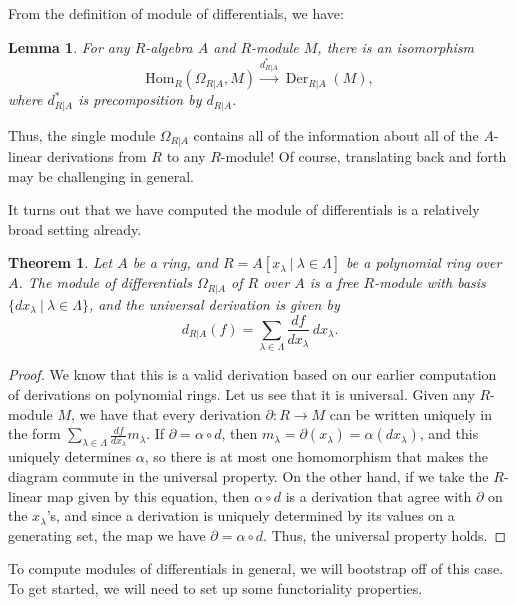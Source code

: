 \documentclass{amsart}[12pt]
\def\Der{\operatorname{Der}}
\newcommand{\Hom}{\mathrm{Hom}}
\numberwithin{equation}{section}
\theoremstyle{plain} %
\newtheorem{thm}[equation]{Theorem}
\newtheorem{lem}[equation]{Lemma}
\theoremstyle{definition}
\theoremstyle{remark}
\newcommand{\xra}[1]{\xrightarrow{#1}}
\begin{document}
From the definition of module of differentials, we have:
\begin{lem} For any $R$-algebra $A$ and $R$-module $M$, there is an isomorphism
\[  \Hom_R(\Omega_{R|A},M) \xra{d^*_{R|A}} \Der_{R|A}(M), \]
where $d^*_{R|A}$ is precomposition by $d_{R|A}$.
\end{lem}

Thus, the single module $\Omega_{R|A}$ contains all of the information about all of the $A$-linear derivations from $R$ to any $R$-module! Of course, translating back and forth may be challenging in general.

It turns out that we have computed the module of differentials is a relatively broad setting already.

\begin{thm}
Let $A$ be a ring, and $R=A[x_\lambda \ | \ \lambda\in \Lambda]$ be a polynomial ring over $A$. The module of differentials $\Omega_{R|A}$ of $R$ over $A$ is a free $R$-module with basis $\{dx_\lambda \ | \ \lambda\in \Lambda\}$, and the universal derivation is given by
\[ d_{R|A}(f) = \sum_{\lambda\in\Lambda} \frac{df}{dx_{\lambda}} \, dx_{\lambda}.\]
\end{thm}
\begin{proof}
We know that this is a valid derivation based on our earlier computation of derivations on polynomial rings. Let us see that it is universal. Given any $R$-module $M$, we have that every derivation $\partial:R\to M$ can be written uniquely in the form $\sum_{\lambda\in\Lambda} \frac{df}{dx_{\lambda}} m_\lambda$. If $\partial = \alpha\circ d$, then $m_\lambda=\partial(x_\lambda) = \alpha(dx_{\lambda})$, and this uniquely determines $\alpha$, so there is at most one homomorphism that makes the diagram commute in the universal property. On the other hand, if we take the $R$-linear map given by this equation, then $\alpha \circ d$ is a derivation that agree with $\partial$ on the $x_\lambda$'s, and since a derivation is uniquely determined by its values on a generating set, the map we have $\partial = \alpha\circ d$. Thus, the universal property holds.
\end{proof}

To compute modules of differentials in general, we will bootstrap off of this case. To get started, we will need to set up some functoriality properties.
\end{document}
